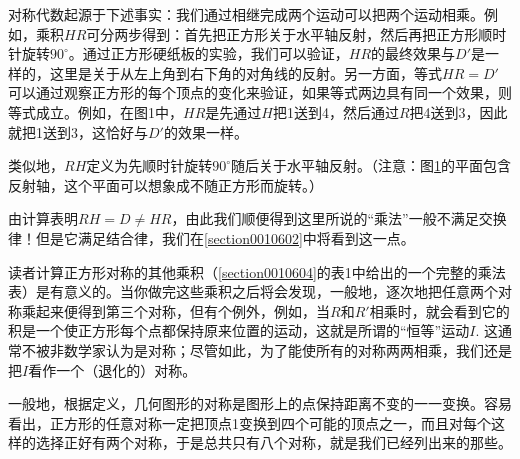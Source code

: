对称代数起源于下述事实：我们通过相继完成两个运动可以把两个运动相乘。例如，乘积$HR$可分两步得到：首先把正方形关于水平轴反射，然后再把正方形顺时针旋转$90^{\circ}$。通过正方形硬纸板的实验，我们可以验证，$HR$的最终效果与$D'$是一样的，这里是关于从左上角到右下角的对角线的反射。另一方面，等式$HR=D'$可以通过观察正方形的每个顶点的变化来验证，如果等式两边具有同一个效果，则等式成立。例如，在图1中，$HR$是先通过$H$把1送到4，然后通过$R$把4送到3，因此就把1送到3，这恰好与$D'$的效果一样。

类似地，$RH$定义为先顺时针旋转$90^{\circ}$随后关于水平轴反射。（注意：图\ref{figure001060101}的平面包含反射轴，这个平面可以想象成不随正方形而旋转。）

\begin{figure}[h]
\centering
{}
\caption{}\label{figure001060101}
\end{figure}


由计算表明$RH=D\neq HR$，由此我们顺便得到这里所说的“乘法”一般不满足交换律！但是它满足结合律，我们在\ref{section0010602}中将看到这一点。

读者计算正方形对称的其他乘积（\ref{section0010604}的表1中给出的一个完整的乘法表）是有意义的。当你做完这些乘积之后将会发现，一般地，逐次地把任意两个对称乘起来便得到第三个对称，但有个例外，例如，当$R$和$R'$相乘时，就会看到它的积是一个使正方形每个点都保持原来位置的运动，这就是所谓的“恒等”运动$I$. 这通常不被非数学家认为是对称；尽管如此，为了能使所有的对称两两相乘，我们还是把$I$看作一个（退化的）对称。

一般地，根据定义，几何图形的对称是图形上的点保持距离不变的一一变换。容易看出，正方形的任意对称一定把顶点1变换到四个可能的顶点之一，而且对每个这样的选择正好有两个对称，于是总共只有八个对称，就是我们已经列出来的那些。

